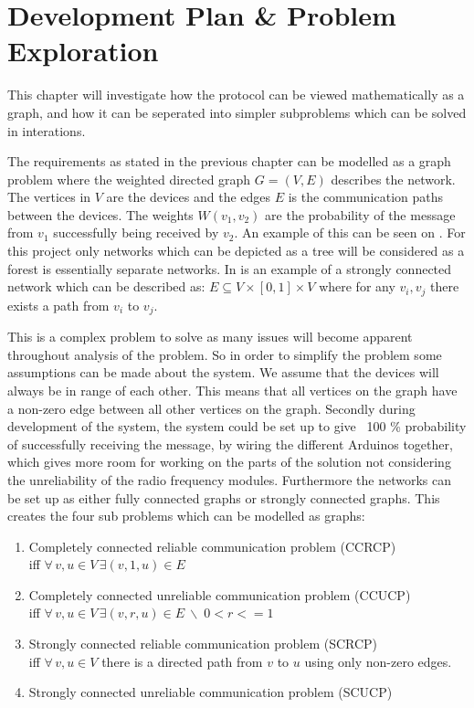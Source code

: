 \chapter{Development Plan \& Problem Exploration}\label{chp:Problems}
This chapter will investigate how the protocol can be viewed mathematically as a graph, and how it can be seperated into simpler subproblems which can be solved in interations.

\noindent The requirements as stated in the previous chapter can be modelled as a graph problem where the weighted directed graph $G = (V, E)$ describes the network. 
The vertices in $V$ are the devices and the edges $E$ is the communication paths between the devices. 
The weights $W(v_1, v_2)$ are the probability of the message from $v_1$ successfully being received by $v_2$.
An example of this can be seen on .
For this project only networks which can be depicted as a tree will be considered as a forest is essentially separate networks.
In  is an example of a strongly connected network which can be described as: $E \subseteq V \times [0,1] \times V$ where for any $v_i, v_j$ there exists a path from $v_i$ to $v_j$.


\noindent This is a complex problem to solve as many issues will become apparent throughout analysis of the problem.
So in order to simplify the problem some assumptions can be made about the system.
We assume that the devices will always be in range of each other.
This means that all vertices on the graph have a non-zero edge between all other vertices on the graph.
Secondly during development of the system, the system could be set up to give ~100 \% probability of successfully receiving the message, by wiring the different Arduinos together, which gives more room for working on the parts of the solution not considering the unreliability of the radio frequency modules.
Furthermore the networks can be set up as either fully connected graphs or strongly connected graphs.
This creates the four sub problems which can be modelled as graphs:  %

\begin{enumerate}[label=\itshape \arabic*\upshape)]
    \item Completely connected reliable communication problem (CCRCP) \\   
    iff $\forall\, v, u \in V \, \exists (v,1,u)\in E$
    \item Completely connected unreliable communication problem (CCUCP) \\
    iff $\forall\, v, u \in V \, \exists (v,r,u)\in E\ \backslash \; 0 < r <= 1$
    \item Strongly connected reliable communication problem (SCRCP) \\  
    iff $\forall\, v, u \in V $ there is a directed path from $v$ to $u$ using only non-zero edges.    
    \item Strongly connected unreliable communication problem (SCUCP)
\end{enumerate}

